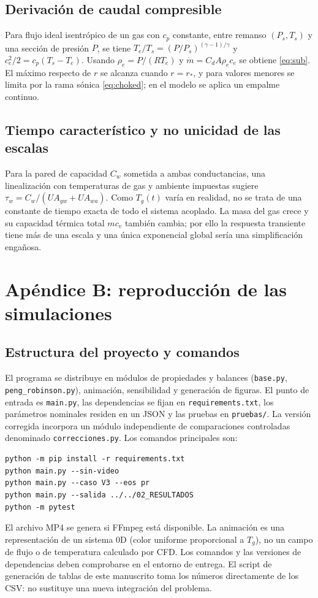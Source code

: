 \documentclass[11pt,letterpaper]{article}
\begin{document}
\subsection{Derivación de caudal compresible}
Para flujo ideal isentrópico de un gas con $c_p$ constante, entre remanso $(P_s,T_s)$ y una sección de presión $P$, se tiene $T_e/T_s=(P/P_s)^{(\gamma-1)/\gamma}$ y $c_e^2/2=c_p(T_s-T_e)$. Usando $\rho_e=P/(RT_e)$ y $\dot m=C_dA\rho_ec_e$ se obtiene \eqref{eq:sub}. El máximo respecto de $r$ se alcanza cuando $r=r_*$, y para valores menores se limita por la rama sónica \eqref{eq:choked}; en el modelo se aplica un empalme continuo.

\subsection{Tiempo característico y no unicidad de las escalas}
Para la pared de capacidad $C_w$ sometida a ambas conductancias, una linealización con temperaturas de gas y ambiente impuestas sugiere $\tau_w=C_w/(UA_{gw}+UA_{wa})$. Como $T_g(t)$ varía en realidad, no se trata de una constante de tiempo exacta de todo el sistema acoplado. La masa del gas crece y su capacidad térmica total $mc_v$ también cambia; por ello la respuesta transiente tiene más de una escala y una única exponencial global sería una simplificación engañosa.

\section{Apéndice B: reproducción de las simulaciones}
\subsection{Estructura del proyecto y comandos}
El programa se distribuye en módulos de propiedades y balances (\texttt{base.py}, \texttt{peng\_robinson.py}), animación, sensibilidad y generación de figuras. El punto de entrada es \texttt{main.py}, las dependencias se fijan en \texttt{requirements.txt}, los parámetros nominales residen en un JSON y las pruebas en \texttt{pruebas/}. La versión corregida incorpora un módulo independiente de comparaciones controladas denominado \texttt{correcciones.py}. Los comandos principales son:
\begin{lstlisting}
python -m pip install -r requirements.txt
python main.py --sin-video
python main.py --caso V3 --eos pr
python main.py --salida ../../02_RESULTADOS
python -m pytest
\end{lstlisting}
El archivo MP4 se genera si FFmpeg está disponible. La animación es una representación de un sistema 0D (color uniforme proporcional a $T_g$), no un campo de flujo o de temperatura calculado por CFD. Los comandos y las versiones de dependencias deben comprobarse en el entorno de entrega. El script de generación de tablas de este manuscrito toma los números directamente de los CSV: no sustituye una nueva integración del problema.
\end{document}
